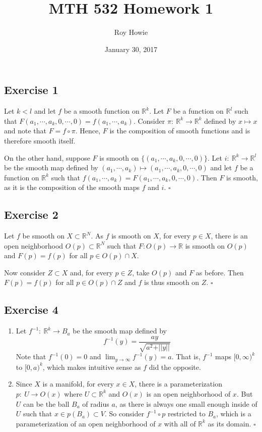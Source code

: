 \documentclass{article}
\begin{document}
\title{MTH 532 Homework 1}
\author{Roy Howie}
\date{January 30, 2017}
\maketitle

\subsection*{Exercise 1}
Let $k < l$ and let $f$ be a smooth function on $\mathbb{R}^k$. Let $F$ be a function on
$\mathbb{R}^l$ such that $F(a_1,\cdots,a_k,0,\cdots,0)=f(a_1,\cdots,a_k)$.
Consider $\pi \colon \ \mathbb{R}^k \to \mathbb{R}^k$ defined by $x \mapsto x$ and note
that $F = f \circ \pi$. Hence, $F$ is the composition of smooth functions and is therefore smooth
itself.

On the other hand, suppose  $F$ is smooth on $\{(a_1,\cdots,a_k,0,\cdots,0)\}$.
Let $i \colon \ \mathbb{R}^k \to \mathbb{R}^l$ be the smooth map defined by
$(a_1,\cdots,a_k) \mapsto (a_1,\cdots,a_k,0,\cdots,0)$ and let $f$ be a function on
$\mathbb{R}^k$ such that $f(a_1,\cdots,a_k)=F(a_1,\cdots,a_k,0,\cdots,0)$.
Then $F$ is smooth, as it is the composition of the smooth maps $f$ and $i$.
\hfill $\square$

\subsection*{Exercise 2}
Let $f$ be smooth on $X \subset \mathbb{R}^N$. As $f$ is smooth on $X$,
for every $p \in X$, there is an open neighborhood $O(p) \subset \mathbb{R}^N$ such that 
$F \colon O(p) \to \mathbb{R}$ is smooth on $O(p)$ and $F(p) = f(p)$ for all $p \in O(p) \cap X$.

Now consider $Z \subset X$ and, for every $p \in Z$, take $O(p)$ and $F$ as before. Then
$F(p) = f(p)$ for all $p \in O(p) \cap Z$ and $f$ is thus smooth on $Z$.
\hfill $\square$

\subsection*{Exercise 4}
\begin{enumerate}[label=\textbf{\alph*}]
\item{
	Let $f^{-1} \colon \ \mathbb{R}^k \to B_a$ be the smooth map defined by
	$$f^{-1}(y) = \frac{ay}{\sqrt{a^2 + \vert\vert y \vert\vert}}$$
	Note that $f^{-1}(0)=0$ and $\lim_{y\to \infty}f^{-1}(y)=a$.
	That is, $f^{-1}$ maps $[0,\infty)^k$ to $[0,a)^k$, which makes intuitive sense
	as $f$ did the opposite.
}
\item{
	Since $X$ is a manifold, for every $x \in X$, there is a parameterization
	$p \colon \ U \to O(x)$ where $U \subset \mathbb{R}^k$ and $O(x)$ is
	an open neighborhood of $x$. But $U$ can be the ball $B_a$ of radius
	$a$, as there is always one small enough inside of $U$ such that
	$x \in p(B_a) \subset V$. So consider $f^{-1} \circ p$ restricted to $B_a$,
	which is a parameterization of an open neighborhood of $x$ with all of
	$\mathbb{R}^k$ as its domain.
}
\hfill $\square$
\end{enumerate}
\end{document}
